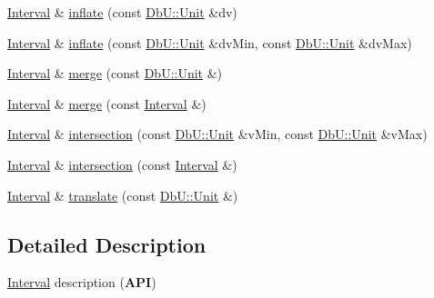 \begin{DoxyCompactItemize}
\item 
\mbox{\hyperlink{classHurricane_1_1Interval}{Interval}} \& \mbox{\hyperlink{classHurricane_1_1Interval_a142c3ec37ebe74c253b3fe0039ef2143}{inflate}} (const \mbox{\hyperlink{group__DbUGroup_ga4fbfa3e8c89347af76c9628ea06c4146}{Db\+U\+::\+Unit}} \&dv)
\item 
\mbox{\hyperlink{classHurricane_1_1Interval}{Interval}} \& \mbox{\hyperlink{classHurricane_1_1Interval_ac311880a39d8e3db79bcbc5d3bb341a6}{inflate}} (const \mbox{\hyperlink{group__DbUGroup_ga4fbfa3e8c89347af76c9628ea06c4146}{Db\+U\+::\+Unit}} \&dv\+Min, const \mbox{\hyperlink{group__DbUGroup_ga4fbfa3e8c89347af76c9628ea06c4146}{Db\+U\+::\+Unit}} \&dv\+Max)
\item 
\mbox{\hyperlink{classHurricane_1_1Interval}{Interval}} \& \mbox{\hyperlink{classHurricane_1_1Interval_ab37a2b3ad247a0a5a4e4946d2b777bec}{merge}} (const \mbox{\hyperlink{group__DbUGroup_ga4fbfa3e8c89347af76c9628ea06c4146}{Db\+U\+::\+Unit}} \&)
\item 
\mbox{\hyperlink{classHurricane_1_1Interval}{Interval}} \& \mbox{\hyperlink{classHurricane_1_1Interval_a99c17b60766c1146ad380ac9981008f7}{merge}} (const \mbox{\hyperlink{classHurricane_1_1Interval}{Interval}} \&)
\item 
\mbox{\hyperlink{classHurricane_1_1Interval}{Interval}} \& \mbox{\hyperlink{classHurricane_1_1Interval_a0eeaaa7eb5b4ade89719c57a2c284909}{intersection}} (const \mbox{\hyperlink{group__DbUGroup_ga4fbfa3e8c89347af76c9628ea06c4146}{Db\+U\+::\+Unit}} \&v\+Min, const \mbox{\hyperlink{group__DbUGroup_ga4fbfa3e8c89347af76c9628ea06c4146}{Db\+U\+::\+Unit}} \&v\+Max)
\item 
\mbox{\hyperlink{classHurricane_1_1Interval}{Interval}} \& \mbox{\hyperlink{classHurricane_1_1Interval_aea3de219c9e8316e19d71d44428b8dc4}{intersection}} (const \mbox{\hyperlink{classHurricane_1_1Interval}{Interval}} \&)
\item 
\mbox{\hyperlink{classHurricane_1_1Interval}{Interval}} \& \mbox{\hyperlink{classHurricane_1_1Interval_acf0aab51a74fe1216bfe112999066466}{translate}} (const \mbox{\hyperlink{group__DbUGroup_ga4fbfa3e8c89347af76c9628ea06c4146}{Db\+U\+::\+Unit}} \&)
\end{DoxyCompactItemize}


\subsection{Detailed Description}
\mbox{\hyperlink{classHurricane_1_1Interval}{Interval}} description ({\bfseries A\+PI}) 

